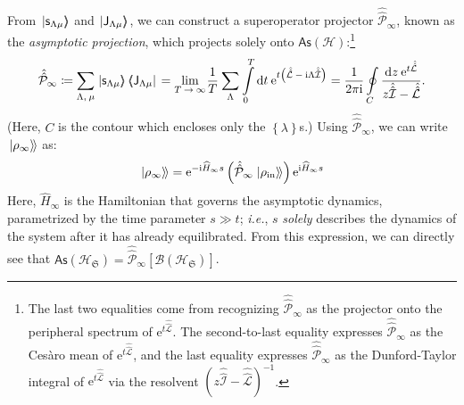 \documentclass[preprints,article,accept,moreauthors,pdftex]{Definitions/mdpi}
\begin{document}
\begin{paracol}{2}
From $\left.\ket{\mathsf{s}_{\Lambda\mu}}\!\!\right\rangle$ and $\left.\ket{\mathsf{J}_{\Lambda\mu}}\!\!\right\rangle$, we can construct a superoperator projector $\hat{\hat{\mathcal{P}}}_{\infty}$, known as the \emph{asymptotic projection}, which projects solely onto $\mathsf{As}\left(\mathcal{H}\right)$:\footnote{The last two equalities come from recognizing $\hat{\hat{\mathcal{P}}}_{\infty}$ as the projector onto the peripheral spectrum of $\mathrm{e}^{t\hat{\hat{\mathcal{L}}}}$. The second-to-last equality expresses $\hat{\hat{\mathcal{P}}}_{\infty}$ as the Cesàro mean of $\mathrm{e}^{t\hat{\hat{\mathcal{L}}}}$, and the last equality expresses $\hat{\hat{\mathcal{P}}}_{\infty}$ as the Dunford-Taylor integral of $\mathrm{e}^{t\hat{\hat{\mathcal{L}}}}$ via the resolvent $\left(z\hat{\hat{\mathcal{I}}}-\hat{\hat{\mathcal{L}}}\right)^{-1}$.}
\begin{equation}
    \label{eq:asymp-proj}
    \hat{\hat{\mathcal{P}}}_{\infty} \coloneqq \sum_{\Lambda,\:\mu} \left.\ket{\mathsf{s}_{\Lambda\mu}}\!\!\right\rangle\left\langle\!\!\bra{\mathsf{J}_{\Lambda\mu}}\right. = \underset{T\:\rightarrow\:\infty}{\mathrm{lim}}\:\!\frac{1}{T}\:\!\sum_{\Lambda}\:\!\int\limits_{0}^{T}\mathrm{d}t\:\mathrm{e}^{t\left(\hat{\hat{\mathcal{L}}}\:-\:\mathrm{i}\Lambda\hat{\hat{\mathcal{I}}}\right)} = \frac{1}{2\pi \mathrm{i}}\oint\limits_{C} \frac{\mathrm{d}z\:\mathrm{e}^{t\hat{\hat{\mathcal{L}}}}}{z\hat{\hat{\mathcal{I}}}-\hat{\hat{\mathcal{L}}}}.
\end{equation}
(Here, $C$ is the contour which encloses only the $\left\{\lambda\right\}$s.) Using $\hat{\hat{\mathcal{P}}}_{\infty}$, we can write $\left.\ket{\rho_{\infty}}\!\right\rangle$ as:
\begin{equation}
    \label{eq:infinite-time-dynamics}
    \left.\ket{\rho_{\infty}}\!\right\rangle = \mathrm{e}^{-\mathrm{i}\widehat{H}_{\infty}s}\left(\hat{\hat{\mathcal{P}}}_{\infty}\left.\ket{\rho_{\mathrm{in}}}\!\right\rangle\right)\mathrm{e}^{\mathrm{i}\widehat{H}_{\infty}s}
\end{equation}
Here, $\widehat{H}_{\infty}$ is the Hamiltonian that governs the asymptotic dynamics, parametrized by the time parameter $s \gg t$; \emph{i.e.}, $s$ \emph{solely} describes the dynamics of the system after it has already equilibrated. From this expression, we can directly see that $\mathsf{As}\left(\mathcal{H}_{\mathfrak{S}}\right) = \hat{\hat{\mathcal{P}}}_{\infty}\left[\mathcal{B}\left(\mathcal{H}_{\mathfrak{S}}\right)\right]$. 


\end{paracol}
\end{document}
